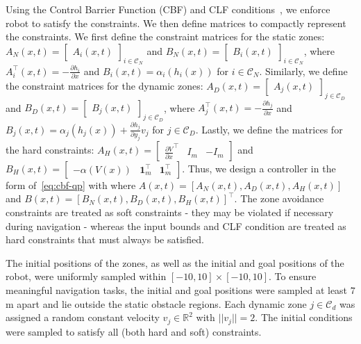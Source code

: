 \documentclass[letterpaper, 10 pt, conference]{ieeeconf}  %
\begin{document}
Using the Control Barrier Function (CBF) and CLF conditions~\cite{ames2016control}, we enforce robot to satisfy the constraints. We then define matrices to compactly represent the constraints. We first define the constraint matrices for the static zones: $A_N(x,t) = \begin{bmatrix}
    A_i(x,t)
\end{bmatrix}_{i \in \mathcal C_N}$ and $B_N(x,t) = \begin{bmatrix}
    B_i(x,t)
\end{bmatrix}_{i \in \mathcal C_N}$, where $A^\top_i(x,t) = -\frac {\partial h_i}{\partial x}$ and $B_i(x,t) = \alpha_i(h_i(x))$ for $i\in \mathcal C_N$. Similarly, we define the constraint matrices for the dynamic zones: $A_D(x,t) = \begin{bmatrix}
    A_j(x,t)
\end{bmatrix}_{j \in \mathcal C_D}$ and $B_D(x,t) = \begin{bmatrix}
    B_j(x,t)
\end{bmatrix}_{j \in \mathcal C_D}$, where $A^\top_j(x,t) = -\frac {\partial h_j}{\partial x}$ and $B_j(x,t) = \alpha_j(h_j(x))+\frac {\partial h_j}{\partial y_j} v_j$ for $j\in \mathcal C_D$. Lastly, we define the matrices for the hard constraints: $A_H(x,t)=\begin{bmatrix}
    \frac {\partial V}{\partial x}^\top & I_m & -I_m
\end{bmatrix}$ and $B_H(x,t) = \begin{bmatrix}
     -\alpha(V(x)) & \mathbf 1_m^\top& \mathbf 1_m^\top
\end{bmatrix}$. Thus, we design a controller in the form of~\eqref{eq:cbf-qp} with
where $A(x,t) = [A_N(x,t) ,A_D(x,t), A_H(x,t) ]$ and $B(x,t) = [B_N(x,t), B_D(x,t), B_H(x,t)]^\top$. The zone avoidance constraints are treated as soft constraints - they may be violated if necessary during navigation - whereas the input bounds and CLF condition are treated as hard constraints that must always be satisfied.


The initial positions of the zones, as well as the initial and goal positions of the robot, were uniformly sampled within $[-10,10]\times [-10,10]$. To ensure meaningful navigation tasks, the initial and goal positions were sampled at least $7$ m apart and lie outside the static obstacle regions. Each dynamic zone $j \in \mathcal{C}_d$ was assigned a random constant velocity $v_j \in \mathbb{R}^2$ with $||v_j||=2$. The initial conditions were sampled to satisfy all (both hard and soft) constraints.
\end{document}
